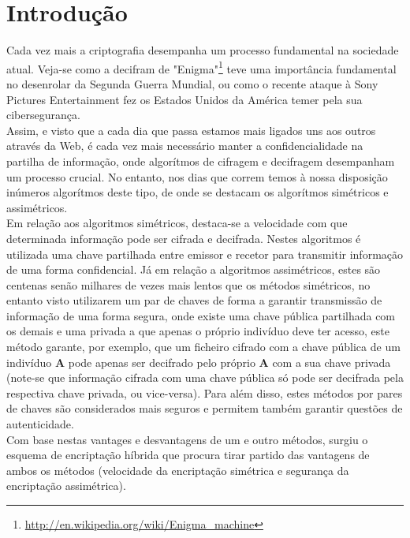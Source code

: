 \documentclass[a4paper,11pt,openright,oneside]{report}
\begin{document}
\tableofcontents
\listoffigures

\clearpage
{}

\chapter{Introdução}
\label{chap.introdução}

Cada vez mais a criptografia desempanha um processo fundamental na sociedade atual. Veja-se como a decifram de "Enigma"\footnote{\url{http://en.wikipedia.org/wiki/Enigma_machine}} teve uma importância fundamental no desenrolar da Segunda Guerra Mundial, ou como o recente ataque à Sony Pictures Entertainment fez os Estados Unidos da América temer pela sua cibersegurança.\\

Assim, e visto que a cada dia que passa estamos mais ligados uns aos outros através da Web, é cada vez mais necessário manter a confidencialidade na partilha de informação, onde algorítmos de cifragem e decifragem desempanham um processo crucial. No entanto, nos dias que correm temos à nossa disposição inúmeros algorítmos deste tipo, de onde se destacam os algorítmos simétricos e assimétricos.\\

Em relação aos algoritmos simétricos, destaca-se a velocidade com que determinada informação pode ser cifrada e decifrada. Nestes algoritmos é utilizada uma chave partilhada entre emissor e recetor para transmitir informação de uma forma confidencial. Já em relação a algoritmos assimétricos, estes são centenas senão milhares de vezes mais lentos que os métodos simétricos, no entanto visto utilizarem um par de chaves de forma a garantir transmissão de informação de uma forma segura, onde existe uma chave pública partilhada com os demais e uma privada a que apenas o próprio indivíduo deve ter acesso, este método garante, por exemplo, que um ficheiro cifrado com a chave pública de um indivíduo \textbf{A} pode apenas ser decifrado pelo próprio \textbf{A} com a sua chave privada (note-se que informação cifrada com uma chave pública só pode ser decifrada pela respectiva chave privada, ou vice-versa). Para além disso, estes métodos por pares de chaves são considerados mais seguros e permitem também garantir questões de autenticidade.\\

Com base nestas vantages e desvantagens de um e outro métodos, surgiu o esquema de encriptação híbrida que procura tirar partido das vantagens de ambos os métodos (velocidade da encriptação simétrica e segurança da encriptação assimétrica).\\
\end{document}
